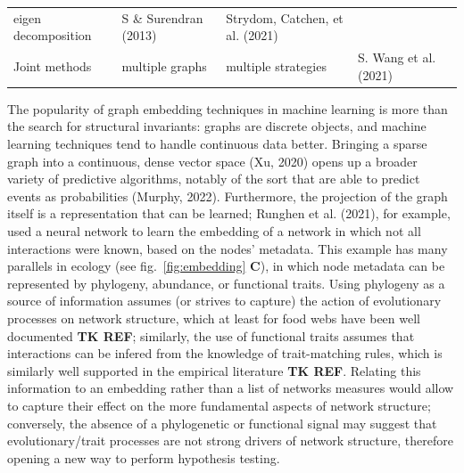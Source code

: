 \documentclass[11pt]{article}
\begin{document}
\begin{longtable}[]{@{}lllll@{}}
\begin{minipage}[t]{0.23\columnwidth}
eigen decomposition\strut
\end{minipage} & \begin{minipage}[t]{0.14\columnwidth}\raggedright
S \& Surendran (2013)\strut
\end{minipage} & \begin{minipage}[t]{0.29\columnwidth}\raggedright
Strydom, Catchen, et al. (2021)\strut
\end{minipage}\tabularnewline
\begin{minipage}[t]{0.09\columnwidth}\raggedright
Joint methods\strut
\end{minipage} & \begin{minipage}[t]{0.11\columnwidth}\raggedright
multiple graphs\strut
\end{minipage} & \begin{minipage}[t]{0.23\columnwidth}\raggedright
multiple strategies\strut
\end{minipage} & \begin{minipage}[t]{0.14\columnwidth}\raggedright
S. Wang et al. (2021)\strut
\end{minipage} & \begin{minipage}[t]{0.29\columnwidth}\raggedright
\strut
\end{minipage}\tabularnewline
\bottomrule
\end{longtable}

The popularity of graph embedding techniques in machine learning is more
than the search for structural invariants: graphs are discrete objects,
and machine learning techniques tend to handle continuous data better.
Bringing a sparse graph into a continuous, dense vector space (Xu, 2020)
opens up a broader variety of predictive algorithms, notably of the sort
that are able to predict events as probabilities (Murphy, 2022).
Furthermore, the projection of the graph itself is a representation that
can be learned; Runghen et al. (2021), for example, used a neural
network to learn the embedding of a network in which not all
interactions were known, based on the nodes' metadata. This example has
many parallels in ecology (see fig.~\ref{fig:embedding} \textbf{C}), in
which node metadata can be represented by phylogeny, abundance, or
functional traits. Using phylogeny as a source of information assumes
(or strives to capture) the action of evolutionary processes on network
structure, which at least for food webs have been well documented
\textbf{TK REF}; similarly, the use of functional traits assumes that
interactions can be infered from the knowledge of trait-matching rules,
which is similarly well supported in the empirical literature \textbf{TK
REF}. Relating this information to an embedding rather than a list of
networks measures would allow to capture their effect on the more
fundamental aspects of network structure; conversely, the absence of a
phylogenetic or functional signal may suggest that evolutionary/trait
processes are not strong drivers of network structure, therefore opening
a new way to perform hypothesis testing.
\end{document}
